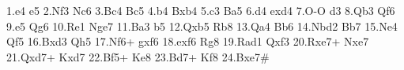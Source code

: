 \documentclass[a4paper]{article}
\begin{document}
	
	\renewcommand{\afterno}{.}

	
	
	\makegametitle

	\begin{texmate}
		1.e4 e5 2.Nf3 Nc6 3.Bc4 Bc5 4.b4 Bxb4 5.c3 Ba5 6.d4 exd4 7.O-O d3
		8.Qb3 Qf6 9.e5 Qg6 10.Re1 Nge7 11.Ba3 b5 12.Qxb5 Rb8 13.Qa4 Bb6
		14.Nbd2 Bb7 15.Ne4 Qf5 16.Bxd3 Qh5 17.Nf6+ gxf6 18.exf6 Rg8 19.Rad1 Qxf3
		20.Rxe7+ Nxe7 21.Qxd7+ Kxd7 22.Bf5+ Ke8 23.Bd7+ Kf8 24.Bxe7\# 
	\end{texmate}


	\vspace{20pt}
	\normalboard
	\notationon
	\preparediagram{}{}
	\makediagrams
	

	
	
	
\end{document}
